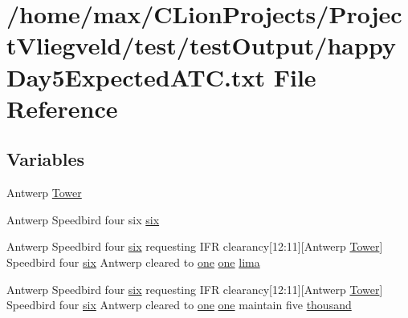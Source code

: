 \hypertarget{happyDay5ExpectedATC_8txt}{}\section{/home/max/\+C\+Lion\+Projects/\+Project\+Vliegveld/test/test\+Output/happy\+Day5\+Expected\+A\+TC.txt File Reference}
\label{happyDay5ExpectedATC_8txt}
\subsection*{Variables}
\begin{DoxyCompactItemize}
\item 
Antwerp \hyperlink{happyDay5ExpectedATC_8txt_aa713126cf5a2ea490c73c69abd6e8b2e}{Tower}
\item 
Antwerp Speedbird four six \hyperlink{happyDay5ExpectedATC_8txt_a57978282a95204080c8ffb626c7d0bd5}{six}
\item 
Antwerp Speedbird four \hyperlink{happyDay5ExpectedATC_8txt_a57978282a95204080c8ffb626c7d0bd5}{six} requesting I\+FR clearancy\mbox{[}12\+:11\mbox{]}\mbox{[}Antwerp \hyperlink{test_2testOutput_2log_8txt_ade5c2a9317c664c53d015e41bdc32393}{Tower}\mbox{]} Speedbird four \hyperlink{happyDay5ExpectedATC_8txt_a57978282a95204080c8ffb626c7d0bd5}{six} Antwerp cleared to \hyperlink{happyDay5ExpectedATC_8txt_a1bdf675837626f29e859d1a241701d26}{one} \hyperlink{happyDay5ExpectedATC_8txt_a1bdf675837626f29e859d1a241701d26}{one} \hyperlink{happyDay5ExpectedATC_8txt_abc10fad7597c191bcd8586b1cddb7835}{lima}
\item 
Antwerp Speedbird four \hyperlink{happyDay5ExpectedATC_8txt_a57978282a95204080c8ffb626c7d0bd5}{six} requesting I\+FR clearancy\mbox{[}12\+:11\mbox{]}\mbox{[}Antwerp \hyperlink{test_2testOutput_2log_8txt_ade5c2a9317c664c53d015e41bdc32393}{Tower}\mbox{]} Speedbird four \hyperlink{happyDay5ExpectedATC_8txt_a57978282a95204080c8ffb626c7d0bd5}{six} Antwerp cleared to \hyperlink{happyDay5ExpectedATC_8txt_a1bdf675837626f29e859d1a241701d26}{one} \hyperlink{happyDay5ExpectedATC_8txt_a1bdf675837626f29e859d1a241701d26}{one} maintain five \hyperlink{happyDay5ExpectedATC_8txt_a429913a0643fe14faca3dca538caa7bb}{thousand}
\item 

\end{DoxyCompactItemize}
